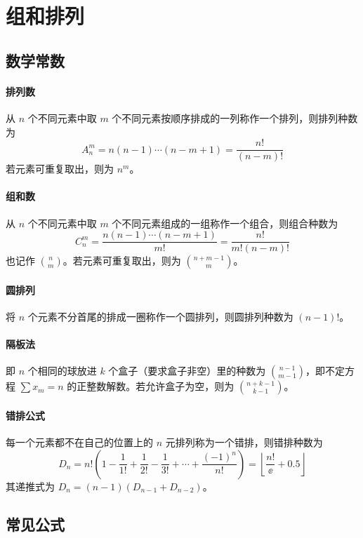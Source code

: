 \documentclass{proart}
\begin{document}
\section{组和排列}

\subsection{数学常数}

\paragraph{排列数}
从 $n$ 个不同元素中取 $m$ 个不同元素按顺序排成的一列称作一个排列，则排列种数为 
\[ A_n^m = n(n-1)\cdots (n-m+1) = \frac{n!}{(n-m)!} \]
若元素可重复取出，则为 $n^m$。

\paragraph{组和数}
从 $n$ 个不同元素中取 $m$ 个不同元素组成的一组称作一个组合，则组合种数为
\[ C_n^m = \frac{n(n-1)\cdots(n-m+1)}{m!} = \frac{n!}{m!(n-m)!} \]
也记作 $\binom{n}{m}$。若元素可重复取出，则为 $\binom{n+m-1}{m}$。

\paragraph{圆排列}
将 $n$ 个元素不分首尾的排成一圈称作一个圆排列，则圆排列种数为 $(n-1)!$。

\paragraph{隔板法}
即 $n$ 个相同的球放进 $k$ 个盒子（要求盒子非空）里的种数为 $\binom{n-1}{m-1}$，即不定方程 $\sum x_m = n$ 的正整数解数。若允许盒子为空，则为 $\binom{n+k-1}{k-1}$。

\paragraph{错排公式}
每一个元素都不在自己的位置上的 $n$ 元排列称为一个错排，则错排种数为
\[ D_n = n! \left( 1 - \frac{1}{1!} + \frac{1}{2!} - \frac{1}{3!} + \cdots + \frac{(-1)^n}{n!} \right) = \left\lfloor \frac{n!}{\ee} + 0.5 \right\rfloor \]
其递推式为 $D_n = (n-1)(D_{n-1} + D_{n-2})$。

\subsection{常见公式}
\end{document}
